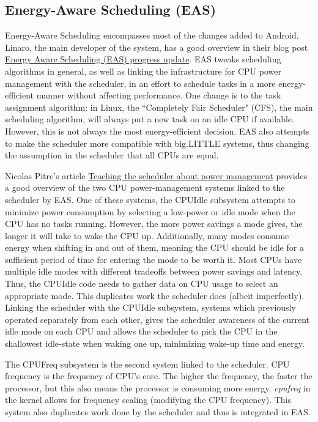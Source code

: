 \documentclass{article}
\begin{document}
\subsection{Energy-Aware Scheduling (EAS)}
Energy-Aware Scheduling encompasses most of the changes added to Android. Linaro, the main developer of the system, has a good overview in their blog post {\href{https://www.linaro.org/blog/core-dump/energy-aware-scheduling-eas-progress-update/}{Energy Aware Scheduling (EAS) progress update}}. EAS tweaks scheduling algorithms in general, as well as linking the infrastructure for CPU power management with the scheduler, in an effort to schedule tasks in a more energy-efficient manner without affecting performance. One change is to the task assignment algorithm: in Linux, the ``Completely Fair Scheduler" (CFS), the main scheduling algorithm, will always put a new task on an idle CPU if available. However, this is not always the most energy-efficient decision. EAS also attempts to make the scheduler more compatible with big.LITTLE systems, thus changing the assumption in the scheduler that all CPUs are equal.

\par
Nicolas Pitre's article \href{https://lwn.net/Articles/602479/}{Teaching the scheduler about power management} provides a good overview of the two CPU power-management systems linked to the scheduler by EAS. One of these systems, the CPUIdle subsystem attempts to minimize power consumption by selecting a low-power or idle mode when the CPU has no tasks running. However, the more power savings a mode gives, the longer it will take to wake the CPU up. Additionally, many modes consume energy when shifting in and out of them, meaning the CPU should be idle for a sufficient period of time for entering the mode to be worth it. Most CPUs have multiple idle modes with different tradeoffs between power savings and latency. Thus, the CPUIdle code needs to gather data on CPU usage to select an appropriate mode. This duplicates work the scheduler does (albeit imperfectly). Linking the scheduler with the CPUIdle subsystem, systems which previously operated separately from each other, gives the scheduler awareness of the current idle mode on each CPU and allows the scheduler to pick the CPU in the shallowest idle-state when waking one up, minimizing wake-up time and energy. 

\par
The CPUFreq subsystem is the second system linked to the scheduler. CPU frequency is the frequency of CPU's core. The higher the frequency, the faster the processor, but this also means the processor is consuming more energy. \textit{cpufreq} in the kernel allows for frequency scaling (modifying the CPU frequency). This system also duplicates work done by the scheduler and thus is integrated in EAS.
\end{document}
